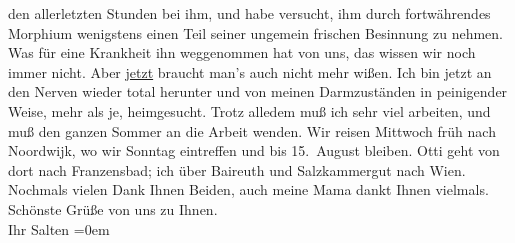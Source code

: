 \begin{ledgroupsized}[t]{13cm}
               den allerletzten Stunden bei ihm, und habe versucht, ihm durch fortwährendes Morphium
               wenigstens einen Teil seiner ungemein frischen Besinnung zu nehmen. Was für eine
               Krankheit ihn weggenommen hat von uns, das wissen wir noch immer nicht. Aber \uline{jetzt} braucht man’s auch nicht mehr wißen. Ich bin
               jetzt an den Nerven wieder total herunter und von meinen Darmzuständen in peinigender
               Weise, mehr als je, heimgesucht. Trotz alledem muß ich sehr viel arbeiten, und muß
               den ganzen Sommer an die Arbeit wenden. Wir reisen Mittwoch{ }früh nach Noordwijk, wo wir Sonntag eintreffen und bis 15. August bleiben. Otti geht von
               dort nach Franzensbad; ich über Baireuth und Salzkammergut
               nach Wien.\pend
           \pstart
           Nochmals vielen Dank Ihnen Beiden, auch meine Mama dankt Ihnen vielmals. Schönste Grüße von uns zu Ihnen. {\\[\baselineskip]}Ihr
                  \spacefill\mbox{Salten}\pend
           \leftskip=0em{}
         
         \endnumbering{}\end{ledgroupsized}  \newcommand{\dateiname}{L03497}\newcommand{\titel}{Felix Salten an Arthur Schnitzler, 5. 7. 1908}\newcommand{\editorInnen}{Martin Anton Müller und Laura Untner}
      